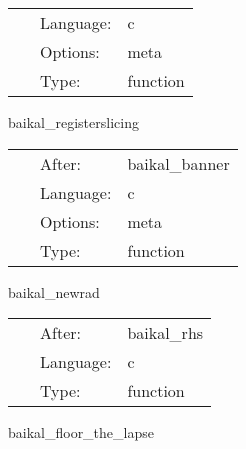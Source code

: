 \hspace{5mm}

 \begin{tabular*}{160mm}{cll} 
~ & Language:  & c \\ 
~ & Options:  & meta \\ 
~ & Type:  & function \\ 
\end{tabular*} 


\vspace{5mm}


\hspace{5mm} baikal\_registerslicing 

\hspace{5mm}{\it register 3+1 slicing condition } 


\hspace{5mm}

 \begin{tabular*}{160mm}{cll} 
~ & After:  & baikal\_banner \\ 
~ & Language:  & c \\ 
~ & Options:  & meta \\ 
~ & Type:  & function \\ 
\end{tabular*} 


\vspace{5mm}


\hspace{5mm} baikal\_newrad 

\hspace{5mm}{\it newrad boundary conditions, scheduled right after rhs eval. } 


\hspace{5mm}

 \begin{tabular*}{160mm}{cll} 
~ & After:  & baikal\_rhs \\ 
~ & Language:  & c \\ 
~ & Type:  & function \\ 
\end{tabular*} 


\vspace{5mm}


\hspace{5mm} baikal\_floor\_the\_lapse 

\hspace{5mm}{\it set lapse = max(lapse\_floor, lapse) } 


